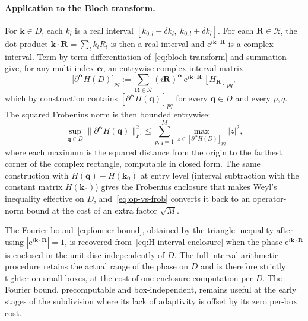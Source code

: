 \documentclass[11pt]{article}
\numberwithin{equation}{section}
\begin{document}
\paragraph{Application to the Bloch transform.}
For \(\mathbf{k} \in D\), each \(k_l\) is a real interval
\([k_{0, l} - \delta k_l,\ k_{0, l} + \delta k_l]\). For each
\(\mathbf{R} \in \mathcal{R}\), the dot product
\(\mathbf{k} \cdot \mathbf{R} = \sum_l k_l R_l\) is then a real interval and
\(\mathrm{e}^{i \mathbf{k} \cdot \mathbf{R}}\) is a complex interval. Term-by-term
differentiation of~\eqref{eq:bloch-transform} and summation give, for any
multi-index \(\bm\alpha\), an entrywise complex-interval matrix
\begin{equation}
    \bigl[\partial^{\bm\alpha} H(D)\bigr]_{pq}
    := \sum_{\mathbf{R} \in \mathcal{R}}
    (i\mathbf{R})^{\bm\alpha}\,
    \mathrm{e}^{i \mathbf{k} \cdot \mathbf{R}}\,
    [H_{\mathbf{R}}]_{pq},
    \label{eq:H-interval-enclosure}
\end{equation}
which by construction contains
\([\partial^{\bm\alpha} H(\mathbf{q})]_{pq}\) for every \(\mathbf{q} \in D\)
and every \(p, q\). The squared Frobenius norm is then bounded entrywise:
\begin{equation}
    \sup_{\mathbf{q} \in D} \|\partial^{\bm\alpha} H(\mathbf{q})\|_F^2
    \leq \sum_{p, q = 1}^M
    \max_{z \in [\partial^{\bm\alpha} H(D)]_{pq}} |z|^2,
    \label{eq:frobenius-interval}
\end{equation}
where each maximum is the squared distance from the origin to the farthest
corner of the complex rectangle, computable in closed form. The same
construction with \(H(\mathbf{q}) - H(\mathbf{k}_0)\) at entry level
(interval subtraction with the constant matrix \(H(\mathbf{k}_0)\)) gives
the Frobenius enclosure that makes Weyl's inequality effective on \(D\),
and~\eqref{eq:op-vs-frob} converts it back to an operator-norm bound at the
cost of an extra factor \(\sqrt{M}\).

\begin{remark}
    The Fourier bound~\eqref{eq:fourier-bound}, obtained by the triangle
    inequality after using \(|\mathrm{e}^{i \mathbf{k} \cdot \mathbf{R}}| = 1\),
    is recovered from~\eqref{eq:H-interval-enclosure} when the phase
    \(\mathrm{e}^{i \mathbf{k} \cdot \mathbf{R}}\) is enclosed in the unit disc
    independently of \(D\). The full interval-arithmetic procedure retains the
    actual range of the phase on \(D\) and is therefore strictly tighter on
    small boxes, at the cost of one enclosure computation per \(D\). The
    Fourier bound, precomputable and box-independent, remains useful at the
    early stages of the subdivision where its lack of adaptivity is offset by
    its zero per-box cost.
\end{remark}
\end{document}
